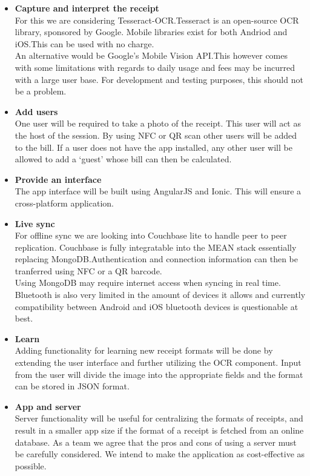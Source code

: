 \documentclass[12pt,a4paper]{article}
\begin{document}
   \begin{itemize}
      \item \textbf{Capture and interpret the receipt}\\
         For this we are considering Tesseract-OCR.\@ Tesseract is an open-source OCR library, sponsored by Google. Mobile libraries exist for both Andriod and iOS.\@ This can be used with no charge.\\
         An alternative would be Google's Mobile Vision API.\@ This however comes with some limitations with regards to daily usage and fees may be incurred with a large user base. For development and testing purposes, this
         should not be a problem.
      \item \textbf{Add users}\\
         One user will be required to take a photo of the receipt. This user will act as the host of the session. By using NFC or QR scan other users will be added to the bill. If a user does not have the app installed, any
         other user will be allowed to add a `guest' whose bill can then be calculated.
      \item \textbf{Provide an interface}\\
         The app interface will be built using AngularJS and Ionic. This will ensure a cross-platform application.
      \item \textbf{Live sync}\\
         For offline sync we are looking into Couchbase lite to handle peer to peer replication. Couchbase is fully integratable into the MEAN stack essentially replacing MongoDB.\@ Authentication and connection information can
         then be tranferred using NFC or a QR barcode.\\
         Using MongoDB may require internet access when syncing in real time.\\
         Bluetooth is also very limited in the amount of devices it allows and currently compatibility between Android and iOS bluetooth devices is questionable at best.
      \item \textbf{Learn}\\
         Adding functionality for learning new receipt formats will be done by extending the user interface and further utilizing the OCR component. Input from the user will divide the image into the appropriate fields and the
         format can be stored in JSON format.
      \item \textbf{App and server}\\
         Server functionality will be useful for centralizing the formats of receipts, and result in a smaller app size if the format of a receipt is fetched from an online database. As a team we agree that the pros and cons of
         using a server must be carefully considered. We intend to make the application as cost-effective as possible.
   \end{itemize}
\end{document}
